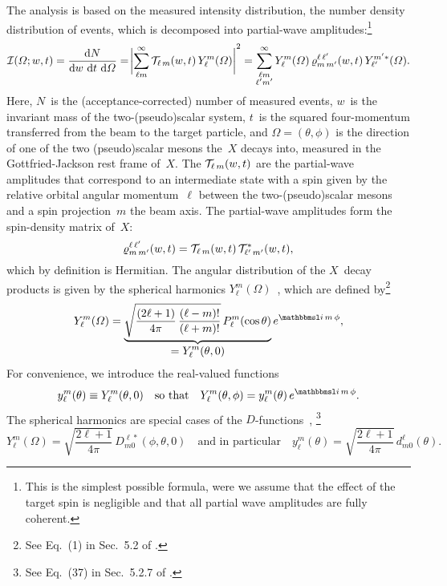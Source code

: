 The analysis is based on the measured intensity distribution, \ie the
number density distribution of events, which is decomposed into
partial-wave amplitudes:\footnote{This is the simplest possible
formula, were we assume that the effect of the target spin is
negligible and that all partial wave amplitudes are fully coherent.}
\begin{equation}
  \label{eq:diffraction_intensity}
  \intensity(\Omega; w, t)
  = \frac{\dif{N}}{\dif{w}\, \dif{t}\, \dif{\Omega}}
  = \Abs[3]{\sum_{\ell m}^\infty \prodAmp_{\ell\, m}(w, t)\, Y_\ell^m(\Omega)}^2
  = \sum_{\substack{\ell m \\ \ell' m'}}^\infty Y_\ell^m(\Omega)\, \varrho^{\ell\, \ell'}_{m\, m'}(w, t)\, Y_{\ell'}^{m' *}(\Omega).
\end{equation}
Here, $N$~is the (acceptance-corrected) number of measured events,
$w$~is the invariant mass of the two-(pseudo)scalar system, $t$~is the
squared four-momentum transferred from the beam to the target
particle, and $\Omega = (\theta, \phi)$ is the direction of one of the
two (pseudo)scalar mesons the~$X$ decays into, measured in the
Gottfried-Jackson rest frame of~$X$.  The $\mathcal{T}_{\ell\, m}(w,
t)$ are the partial-wave amplitudes that correspond to an intermediate
state with a spin given by the relative orbital angular
momentum~$\ell$ between the two-(pseudo)scalar mesons and a spin
projection~$m$ \wrt the beam axis.  The partial-wave amplitudes form
the spin-density matrix of~$X$:
\begin{equation}
  \label{eq:diffraction_spin_dens_def}
  \varrho^{\ell\, \ell'}_{m\, m'}(w, t)
  = \mathcal{T}_{\ell\, m}(w, t)\, \mathcal{T}_{\ell'\, m'}^*(w, t),
\end{equation}
which by definition is Hermitian.  The angular distribution of the
$X$~decay products is given by the spherical harmonics
$Y_\ell^m(\Omega)$~\cite{wikipedia:sphericalHarm}, which are defined
by\footnote{See Eq.~(1) in Sec.~5.2 of
.}
\begin{equation}
  \label{eq:spherical_harm_def}
  Y_\ell^m(\Omega)
  = \dUnderbrace{\sqrt{\frac{(2 \ell + 1)}{4 \pi}\, \frac{(\ell -m)!}{(\ell + m)!}}\, P_\ell^m(\cos\theta)}{= Y_\ell^m(\theta, 0)}\, e^{\imag\, m\, \phi},
\end{equation}
For convenience, we introduce the real-valued functions
\begin{equation}
  \label{eq:small_y_def}
  y_\ell^m(\theta)
  \equiv Y_\ell^m(\theta, 0)
  \quad\text{so that}\quad
  Y_\ell^m(\theta, \phi)
  = y_\ell^m(\theta)\, e^{\imag\, m\, \phi}.
\end{equation}
The spherical harmonics are special cases of the
$D$-functions~\cite{wikipedia:wignerD}, \ie\footnote{See Eq.~(37) in
Sec.~5.2.7 of .}
\begin{equation}
  \label{eq:spherical_harm_wigner_d}
  Y_\ell^m(\Omega)
  = \sqrt{\frac{2 \ell + 1}{4 \pi}}\, D^{\ell *}_{m 0}(\phi, \theta, 0)
  \quad\text{and in particular}\quad
  y_\ell^m(\theta)
  = \sqrt{\frac{2 \ell + 1}{4 \pi}}\, d^\ell_{m 0}(\theta).
\end{equation}

